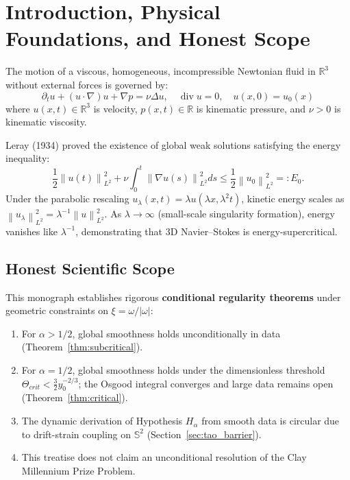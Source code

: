 \documentclass[11pt,reqno]{amsart}
\numberwithin{equation}{section}
\theoremstyle{definition}
\newcommand{\R}{\mathbb{R}}
\newcommand{\Sspec}{\mathbb{S}}
\newcommand{\norm}[1]{\left\lVert#1\right\rVert}
\begin{document}
\maketitle
\tableofcontents
\newpage

\section{Introduction, Physical Foundations, and Honest Scope}

The motion of a viscous, homogeneous, incompressible Newtonian fluid in $\R^3$ without external forces is governed by:
\begin{equation}\label{eq:NS}
\partial_t u + (u \cdot \nabla) u + \nabla p = \nu \Delta u, \quad \operatorname{div} u = 0, \quad u(x, 0) = u_0(x)
\end{equation}
where $u(x,t) \in \R^3$ is velocity, $p(x,t) \in \R$ is kinematic pressure, and $\nu > 0$ is kinematic viscosity.

Leray (1934) proved the existence of global weak solutions satisfying the energy inequality:
\begin{equation}\label{eq:energy_inequality}
\frac{1}{2} \norm{u(t)}_{L^2}^2 + \nu \int_0^t \norm{\nabla u(s)}_{L^2}^2 ds \le \frac{1}{2} \norm{u_0}_{L^2}^2 =: E_0.
\end{equation}
Under the parabolic rescaling $u_\lambda(x,t) = \lambda u(\lambda x, \lambda^2 t)$, kinetic energy scales as $\norm{u_\lambda}_{L^2}^2 = \lambda^{-1} \norm{u}_{L^2}^2$. As $\lambda \to \infty$ (small-scale singularity formation), energy vanishes like $\lambda^{-1}$, demonstrating that 3D Navier--Stokes is energy-supercritical.

\subsection*{Honest Scientific Scope}
This monograph establishes rigorous \textbf{conditional regularity theorems} under geometric constraints on $\xi = \omega / |\omega|$:
\begin{enumerate}[label=(\roman*)]
\item For $\alpha > 1/2$, global smoothness holds unconditionally in data (Theorem~\ref{thm:subcritical}).
\item For $\alpha = 1/2$, global smoothness holds under the dimensionless threshold $\Theta_{crit} < \frac{3}{2} y_0^{-2/3}$; the Osgood integral converges and large data remains open (Theorem~\ref{thm:critical}).
\item The dynamic derivation of Hypothesis $H_\alpha$ from smooth data is circular due to drift-strain coupling on $\Sspec^2$ (Section~\ref{sec:tao_barrier}).
\item This treatise does not claim an unconditional resolution of the Clay Millennium Prize Problem.
\end{enumerate}
\end{document}
